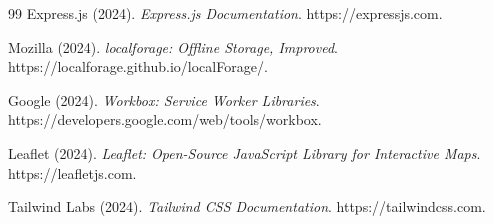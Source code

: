 \begin{thebibliography}{99}
Express.js (2024). \textit{Express.js Documentation}. https://expressjs.com.

Mozilla (2024). \textit{localforage: Offline Storage, Improved}. https://localforage.github.io/localForage/.

Google (2024). \textit{Workbox: Service Worker Libraries}. https://developers.google.com/web/tools/workbox.

Leaflet (2024). \textit{Leaflet: Open-Source JavaScript Library for Interactive Maps}. https://leafletjs.com.

Tailwind Labs (2024). \textit{Tailwind CSS Documentation}. https://tailwindcss.com.

\end{thebibliography}
